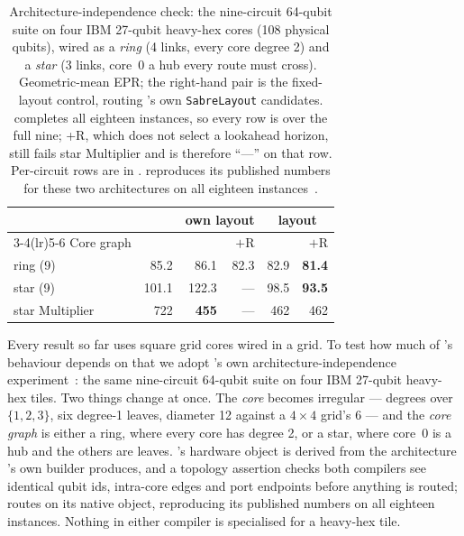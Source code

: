 \begin{table}[t]
\centering
\caption{Architecture-independence check: the nine-circuit 64-qubit
  suite on four IBM 27-qubit heavy-hex cores (108 physical qubits),
  wired as a \emph{ring} (4 links, every core degree 2) and a
  \emph{star} (3 links, core~0 a hub every route must cross).
  Geometric-mean EPR; the right-hand pair is the fixed-layout control,
  \PORTER{} routing \dSABRE{}'s own \texttt{SabreLayout} candidates.
  \PORTER{} completes all eighteen instances, so every row is over the
  full nine; \PORTER{}+R, which does not select a lookahead horizon,
  still fails star Multiplier and is therefore ``---'' on that row.
  Per-circuit rows are in \appTables{}. \dSABRE{} reproduces its published numbers
  for these two architectures on all eighteen instances~\cite{lidsabre}.}
\label{tab:heavyhex}
\setlength{\tabcolsep}{4pt}
\small
\begin{tabular}{@{}l r rr rr@{}}
\toprule
 & & \multicolumn{2}{c}{own layout} & \multicolumn{2}{c}{\dSABRE{} layout} \\
\cmidrule(lr){3-4}\cmidrule(lr){5-6}
Core graph & \dSABRE{} & \PORTER{} & $+$R & \PORTER{} & $+$R \\
\midrule
ring (9)          &  85.2 &  86.1 & 82.3 &  82.9 & \textbf{81.4} \\
star (9)          & 101.1 & 122.3 &  --- &  98.5 & \textbf{93.5} \\
\midrule
star Multiplier   &   722 & \textbf{455} &  --- &   462 &   462 \\
\bottomrule
\end{tabular}
\end{table}


Every result so far uses square grid cores wired in a grid. To test how
much of \PORTER{}'s behaviour depends on that we adopt \dSABRE{}'s own
architecture-independence experiment~\cite{lidsabre}: the same
nine-circuit 64-qubit suite on four IBM 27-qubit heavy-hex tiles. Two
things change at once. The \emph{core} becomes irregular --- degrees
over $\{1,2,3\}$, six degree-1 leaves, diameter 12 against a
$4{\times}4$ grid's 6 --- and the \emph{core graph} is either a ring,
where every core has degree 2, or a star, where core~0 is a hub and the
others are leaves. \PORTER{}'s hardware object is derived from the
architecture \dSABRE{}'s own builder produces, and a topology assertion
checks both compilers see identical qubit ids, intra-core edges and
port endpoints before anything is routed; \dSABRE{} routes on its
native object, reproducing its published numbers on all eighteen
instances. Nothing in either compiler is specialised for a heavy-hex
tile.

